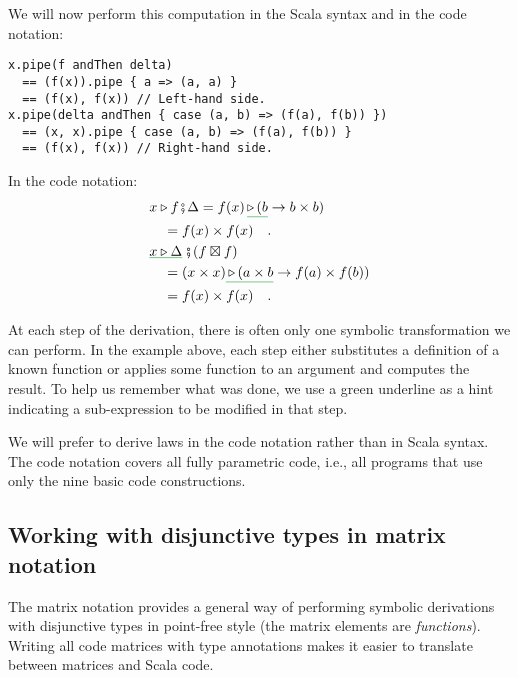 We will now perform this computation in the Scala syntax and in the
code notation:
\begin{lstlisting}
x.pipe(f andThen delta)
  == (f(x)).pipe { a => (a, a) }
  == (f(x), f(x)) // Left-hand side.
x.pipe(delta andThen { case (a, b) => (f(a), f(b)) })
  == (x, x).pipe { case (a, b) => (f(a), f(b)) }
  == (f(x), f(x)) // Right-hand side.
\end{lstlisting}
In the code notation:
\begin{align*}
 & x\triangleright f\bef\Delta=f(x)\,\gunderline{\triangleright\,(b}\rightarrow b\times b)\\
 & \quad=f(x)\times f(x)\quad.\\
 & \gunderline{x\triangleright\Delta}\,\bef(f\boxtimes f)\\
 & \quad=(x\times x)\gunderline{\,\triangleright\,(a\times b}\rightarrow f(a)\times f(b))\\
 & \quad=f(x)\times f(x)\quad.
\end{align*}

At each step of the derivation, there is often only one symbolic transformation
we can perform. In the example above, each step either substitutes
a definition of a known function or applies some function to an argument
and computes the result. To help us remember what was done, we use
a green underline as a hint indicating a sub-expression to be modified
in that step. 

We will prefer to derive laws in the code notation rather than in
Scala syntax. The code notation covers all fully parametric code,
i.e., all programs that use only the nine basic code constructions.

\subsection{Working with disjunctive types in matrix notation\label{subsec:Working-with-disjunctive-functions}}

The matrix notation provides a general way of performing symbolic
derivations with disjunctive types in point-free style (the matrix
elements are \emph{functions}). Writing all code matrices with type
annotations makes it easier to translate between matrices and Scala
code.

